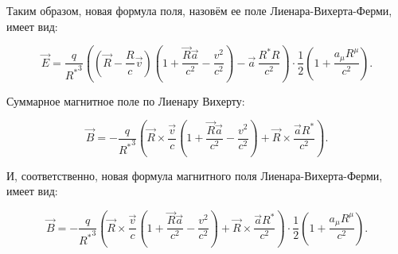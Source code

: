 \documentclass[12pt]{article}
\begin{document}
Таким образом, новая формула поля, назовём ее поле Лиенара-Вихерта-Ферми, имеет вид:

$$\vec{E} = \frac{q}{{{R}^{*}}^{3}}\left( \left(\vec{R}-\frac{R}{c}\vec{v} \right) \left(1 + \frac{\vec{R}\vec{a}}{c^2} - \frac{v^2}{c^2} \right) - \vec{a}\,\frac{{R}^{*}R}{c^2} \right) \cdot \frac{1}{2} \left(1 + \frac{a_{\mu} R^{\mu}}{c^2}\right).$$


Суммарное магнитное поле по Лиенару Вихерту:

$$\vec{B} = -\frac{q}{{{R}^{*}}^3}\left(\vec{R}\times\frac{\vec{v}}{c}\left(1 + \frac{\vec{R}\vec{a}}{c^2} - \frac{v^2}{c^2}\right) + \vec{R}\times\frac{\vec{a}{{R}^{*}}}{c^2}\right).$$

И, соответственно, новая формула магнитного поля Лиенара-Вихерта-Ферми, имеет вид:

$$\vec{B} = -\frac{q}{{{R}^{*}}^3}\left(\vec{R}\times\frac{\vec{v}}{c}\left(1 + \frac{\vec{R}\vec{a}}{c^2} - \frac{v^2}{c^2}\right) + \vec{R}\times\frac{\vec{a}{{R}^{*}}}{c^2}\right) \cdot \frac{1}{2} \left(1 + \frac{a_{\mu} R^{\mu}}{c^2}\right).$$
\end{document}
